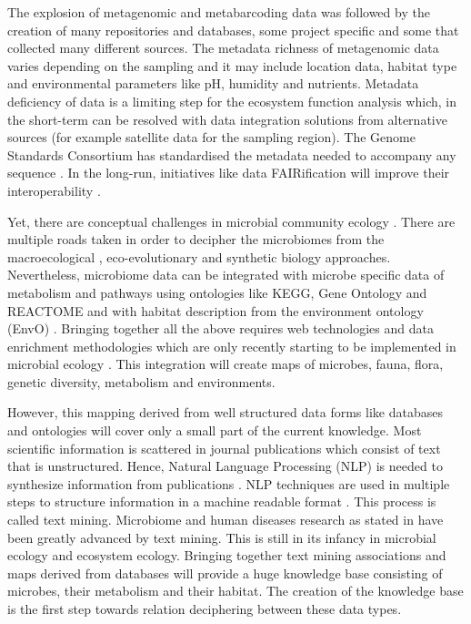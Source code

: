 The explosion of metagenomic and metabarcoding data was followed by the creation
of many repositories and databases, some project specific and some that
collected many different sources. The metadata richness of metagenomic data
varies depending on the sampling and it may include location data, habitat type
and environmental parameters like pH, humidity and nutrients. Metadata
deficiency of data is a limiting step for the ecosystem function analysis
which, in the short-term can be resolved with data integration solutions from
alternative sources (for example satellite data for the sampling region). 
The Genome Standards Consortium has standardised the metadata needed 
to accompany any sequence \parencite{yilmaz2011minimum,Field2011}.
In the long-run, initiatives like data FAIRification will improve their
interoperability \parencite{wilkinson2016the-fair}.

Yet, there are conceptual challenges in microbial community ecology \parencite{prosser2020Conceptual}.
There are multiple roads taken in order to decipher the microbiomes from the macroecological \parencite{Mascarenhas2020}, 
eco-evolutionary \parencite{martiny2023Investigating, loreau2023Opportunities}
and synthetic biology \parencite{Leggieri2021} approaches.
Nevertheless, microbiome data can be integrated with microbe
specific data of metabolism and pathways using ontologies like KEGG, Gene
Ontology and REACTOME and with habitat description from the environment
ontology (EnvO) \parencite{buttigieg2016environment}. Bringing together all the above requires web technologies and
data enrichment methodologies which are only recently starting to be
implemented in microbial ecology \parencite{jiang2016Microbiome}. This integration
will create maps of microbes, fauna, flora, genetic diversity, metabolism and environments. 

However, this mapping derived from well structured data forms like databases
and ontologies will cover only a small part of the current knowledge. Most
scientific information is scattered in journal publications which consist of
text that is unstructured. Hence, Natural Language Processing (NLP) is needed to synthesize
information from publications \parencite{jensen2006Literature,}.
NLP techniques are used in multiple steps to structure information in a machine readable 
format \parencite{10.5555/1199003}. This process is called text mining.
Microbiome and
human diseases research as stated in \textcite{badal2019Challenges} have been
greatly advanced by text mining. This is still in its infancy in microbial
ecology and ecosystem ecology. Bringing together text mining associations and maps derived from
databases will provide a huge knowledge base consisting of microbes, their
metabolism and their habitat. The creation of the knowledge base is the first
step towards relation deciphering between these data types.

